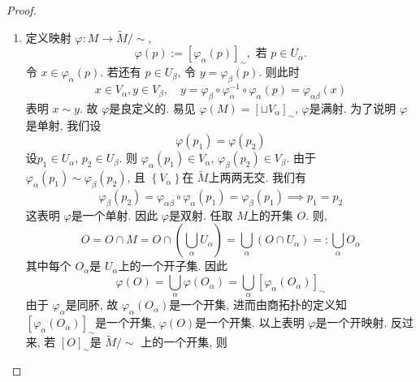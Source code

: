 \documentclass[../main.tex]{subfiles}
\begin{document}
\begin{proof}
\begin{enumerate}
\begin{enumerate}
        若 \(  x\sim y  \), \(  y\sim z  \). 则 \[
        \exists \alpha ,\beta , \gamma ,s.t. x\in V_{\alpha }, y \in V_{\beta }, z \in V_{ \gamma }\text{ 且 } y=  \varphi _{\alpha \beta }\left( x \right), z=  \varphi _{\beta  \gamma }\left( y \right)  
        \]  此时我们有 \[
        x\in V_{\alpha },z \in V_{ \gamma },\text{ 且 } z=  \varphi _{\beta  \gamma }\circ  \varphi _{\alpha \beta }\left( x \right)=  \varphi _{\alpha  \gamma }\left( x \right)  
        \]这表明 \(  x \sim z  \). 最终我们得到 \(  \sim   \)上一个等价关系.  
        \item 定义映射 \( \varphi :M\to \tilde{M}/\sim  \), \[
         \varphi \left( p\right):=  [ \varphi _{\alpha }\left( p \right) ]_{\sim },\text{ 若 }  p\in U_{\alpha }  . 
        \] 令 \(  x \in  \varphi _{\alpha }\left( p \right)   \). 若还有 \(  p \in U_{\beta }  \), 令 \(  y=  \varphi _{\beta }\left( p \right)   \). 则此时 \[
        x\in V_{\alpha }, y\in V_{\beta },\quad y=   \varphi _{\beta }\circ  \varphi _{\alpha }^{-1} \circ \varphi _{\alpha }\left( p \right)=  \varphi _{\alpha \beta }\left( x \right)  
        \]  表明 \(  x\sim y  \). 故 \(   \varphi   \)是良定义的.   易见 \(   \varphi \left( M \right)   = [\sqcup   V_{\alpha }]_{\sim }\), \(   \varphi   \)是满射.  为了说明 \(   \varphi   \)是单射, 我们设 \[
         \varphi \left( p_1 \right)=  \varphi \left( p_2 \right)  
        \] 设\(  p_1\in U_{\alpha }  \), \(  p_2\in U_{\beta }  \). 则 \(   \varphi _{\alpha }\left( p_1 \right)\in V_{\alpha }   \), \(   \varphi _{\beta }\left( p_2 \right)\in V_{\beta }   \).  由于 \(   \varphi _{\alpha }\left( p_1 \right)\sim  \varphi _{\beta }\left( p_2 \right)    \), 且 \(  \left\{ V_{\alpha } \right\}  \)在 \(  \tilde{M}  \)上两两无交.  我们有 \[
         \varphi _{\beta }\left( p_2 \right)=  \varphi _{\alpha \beta }\circ  \varphi _{\alpha }\left( p_1 \right)=    \varphi _{\beta }\left( p_1 \right)\implies p_1= p_2 
        \]   这表明 \(   \varphi   \)是一个单射. 因此 \(   \varphi   \)是双射. 任取 \(  M  \)上的开集 \(  O  \).     则, \[
        O= O\cap M= O\cap \left( \bigcup _{\alpha }U_{\alpha } \right)= \bigcup _{\alpha }\left( O\cap U_{\alpha } \right)= : \bigcup _{\alpha }O_{\alpha }  
        \]其中每个 \(  O_{\alpha }  \)是 \(  U_{\alpha }  \)上的一个开子集. 因此 \[
         \varphi \left( O \right)= \bigcup _{\alpha } \varphi \left( O_{\alpha } \right)= \bigcup _{\alpha }[  \varphi _{\alpha }\left( O_{\alpha } \right) ]_{\sim }  
        \]  由于 \(   \varphi _{\alpha }  \)是同肧, 故 \(   \varphi _{\alpha }\left( O_{\alpha } \right)   \)是一个开集, 进而由商拓扑的定义知 \(  [ \varphi _{\alpha }\left( O_{\alpha } \right) ]_{\sim }  \)是一个开集,  \(   \varphi \left( O \right)   \)是一个开集. 以上表明 \(   \varphi   \)是一个开映射. 反过来, 若 \(  [O]_{\sim }  \)是 \(  \tilde{M}/\sim   \)       上的一个开集, 则 \[
\]
\end{enumerate}
\end{enumerate}
\end{proof}
\end{document}
